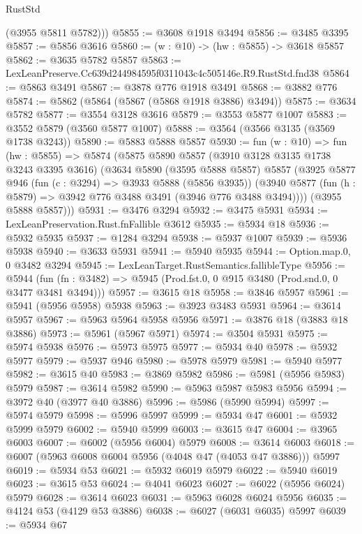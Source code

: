\begin{lexlean}{RustStd}
\begin{coremodule}
        (@3955 @5811 @5782)))
@5855 := @3608 @1918 @3494
@5856 := @3485 @3395
@5857 := @5856 @3616
@5860 := (w : @10) -> (hw : @5855) -> @3618 @5857
@5862 := @3635 @5782 @5857
@5863 := LexLeanPreserve.Cc639d244984595f0311043c4c505146e.R9.RustStd.fnd38
@5864 := @5863 @3491
@5867 := @3878 @776 @1918 @3491
@5868 := @3882 @776
@5874 := @5862 (@5864 (@5867 (@5868 @1918 @3886) @3494))
@5875 := @3634 @5782
@5877 := @3554 @3128 @3616
@5879 := @3553 @5877 @1007
@5883 := @3552 @5879 (@3560 @5877 @1007)
@5888 := @3564 (@3566 @3135 (@3569 @1738 @3243))
@5890 := @5883 @5888 @5857
@5930 := fun (w : @10) =>
  fun (hw : @5855) =>
  @5874
    (@5875
      @5890
      @5857
      (@3910 @3128 @3135 @1738 @3243 @3395 @3616)
      (@3634
        @5890
        (@3595 @5888 @5857)
        @5857
        (@3925
          @5877
          @946
          (fun (c : @3294) => @3933 @5888 (@5856 @3935))
          (@3940 @5877 (fun (h : @5879) => @3942 @776 @3488 @3491 (@3946 @776 @3488 @3494))))
        (@3955 @5888 @5857)))
@5931 := @3476 @3294
@5932 := @3475 @5931
@5934 := LexLeanPreservation.Rust.fnFallible @3612
@5935 := @5934 @18
@5936 := @5932 @5935
@5937 := @1284 @3294
@5938 := @5937 @1007
@5939 := @5936 @5938
@5940 := @3633 @5931
@5941 := @5940 @5935
@5944 := Option.map.{0, 0} @3482 @3294
@5945 := LexLeanTarget.RustSemantics.fallibleType
@5956 := @5944
    (fun (fn : @3482) => @5945 (Prod.fst.{0, 0} @915 @3480 (Prod.snd.{0, 0} @3477 @3481 @3494)))
@5957 := @3615 @18
@5958 := @3846 @5957
@5961 := @5941 (@5956 @5958) @5938
@5963 := @3923 @3483 @5931
@5964 := @3614 @5957
@5967 := @5963 @5964 @5958 @5956
@5971 := @3876 @18 (@3883 @18 @3886)
@5973 := @5961 (@5967 @5971)
@5974 := @3504 @5931
@5975 := @5974 @5938
@5976 := @5973 @5975
@5977 := @5934 @40
@5978 := @5932 @5977
@5979 := @5937 @946
@5980 := @5978 @5979
@5981 := @5940 @5977
@5982 := @3615 @40
@5983 := @3869 @5982
@5986 := @5981 (@5956 @5983) @5979
@5987 := @3614 @5982
@5990 := @5963 @5987 @5983 @5956
@5994 := @3972 @40 (@3977 @40 @3886)
@5996 := @5986 (@5990 @5994)
@5997 := @5974 @5979
@5998 := @5996 @5997
@5999 := @5934 @47
@6001 := @5932 @5999 @5979
@6002 := @5940 @5999
@6003 := @3615 @47
@6004 := @3965 @6003
@6007 := @6002 (@5956 @6004) @5979
@6008 := @3614 @6003
@6018 := @6007 (@5963 @6008 @6004 @5956 (@4048 @47 (@4053 @47 @3886))) @5997
@6019 := @5934 @53
@6021 := @5932 @6019 @5979
@6022 := @5940 @6019
@6023 := @3615 @53
@6024 := @4041 @6023
@6027 := @6022 (@5956 @6024) @5979
@6028 := @3614 @6023
@6031 := @5963 @6028 @6024 @5956
@6035 := @4124 @53 (@4129 @53 @3886)
@6038 := @6027 (@6031 @6035) @5997
@6039 := @5934 @67

\end{coremodule}
\end{lexlean}
